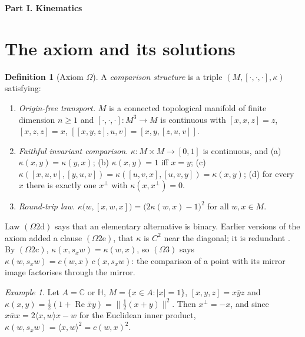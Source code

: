 \documentclass[aps,pra,onecolumn,superscriptaddress,nofootinbib,10pt]{revtex4-2}
\theoremstyle{definition}
\newtheorem{definition}[theorem]{Definition}
\theoremstyle{remark}
\newtheorem{example}[theorem]{Example}
\newcommand{\C}{\mathbb{C}}
\newcommand{\HH}{\mathbb{H}}
\newcommand{\re}{\operatorname{Re}}
\newcommand{\ip}[2]{\langle #1,#2\rangle}
\newcommand{\hp}[3]{[#1,#2,#3]}
\newcommand{\paperpart}[1]{\par\bigskip\begin{center}\large\bfseries #1\end{center}\par\medskip}
\begin{document}
\paperpart{Part I.  Kinematics}

\section{The axiom and its solutions}\label{sec:axiom}

\begin{definition}[Axiom $\Omega$]\label{def:cs}
A \emph{comparison structure} is a triple $(M,\hp{\cdot}{\cdot}{\cdot},\kappa)$ satisfying:
\begin{enumerate}[label=$(\Omega\arabic*)$,leftmargin=3.2em]
\item \emph{Origin-free transport.}  $M$ is a connected topological manifold of finite dimension
$n\ge1$ and $\hp{\cdot}{\cdot}{\cdot}\colon M^3\to M$ is continuous with
$\hp{x}{x}{z}=z$, $\hp{x}{z}{z}=x$, $\hp{\hp{x}{y}{z}}{u}{v}=\hp{x}{y}{\hp{z}{u}{v}}$.
\item \emph{Faithful invariant comparison.}  $\kappa\colon M\times M\to[0,1]$ is continuous, and
(a) $\kappa(x,y)=\kappa(y,x)$; (b) $\kappa(x,y)=1$ iff $x=y$;
(c) $\kappa(\hp{x}{u}{v},\hp{y}{u}{v})=\kappa(\hp{u}{v}{x},\hp{u}{v}{y})=\kappa(x,y)$;
(d) for every $x$ there is exactly one $x^\perp$ with $\kappa(x,x^\perp)=0$.
\item \emph{Round-trip law.}  $\kappa\bigl(w,\hp{x}{w}{x}\bigr)=\bigl(2\kappa(w,x)-1\bigr)^2$ for all
$w,x\in M$.
\end{enumerate}
\end{definition}
Law $(\Omega2\mathrm d)$ says that an elementary alternative is binary.  Earlier versions of the axiom
added a clause $(\Omega2\mathrm e)$, that $\kappa$ is $C^2$ near the diagonal; it is redundant
\cite[Thm.~3.11]{PaperI}.  By $(\Omega2\mathrm c)$,
$\kappa(x,s_xw)=\kappa(w,x)$, so $(\Omega3)$ says $\kappa(w,s_xw)=c(w,x)\,c(x,s_xw)$: the comparison of
a point with its mirror image factorises through the mirror.

\begin{example}\label{ex:models}
Let $A=\C$ or $\HH$, $M=\{x\in A:\lvert x\rvert=1\}$, $\hp{x}{y}{z}=x\bar yz$ and
$\kappa(x,y)=\tfrac12(1+\re\bar xy)=\lVert\tfrac12(x+y)\rVert^2$.  Then $x^\perp=-x$, and since
$x\bar wx=2\ip{x}{w}x-w$ for the Euclidean inner product, $\kappa(w,s_xw)=\ip{x}{w}^2=c(w,x)^2$.
\end{example}
\end{document}
